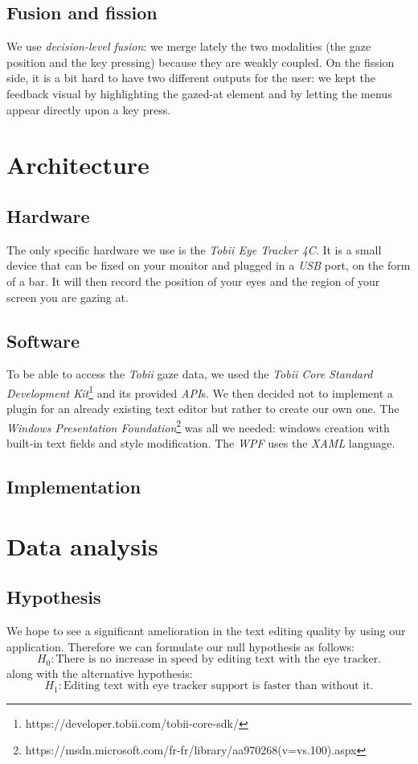 \documentclass[12pt, a4paper, twoside]{article}
\begin{document}
\subsection{Fusion and fission}
We use \textit{decision-level fusion}: we merge lately the two modalities (the gaze position and the key pressing) because they are weakly coupled. On the fission side, it is a bit hard to have two different outputs for the user: we kept the feedback visual by highlighting the gazed-at element and by letting the menus appear directly upon a key press.  

\section{Architecture}

\subsection{Hardware}
The only specific hardware we use is the \textit{Tobii Eye Tracker 4C}. It is a small device that can be fixed on your monitor and plugged in a \textit{USB} port, on the form of a bar. It will then record the position of your eyes and the region of your screen you are gazing at. 

\subsection{Software}
To be able to access the \textit{Tobii} gaze data, we used the \textit{Tobii Core Standard Development Kit}\footnote{https://developer.tobii.com/tobii-core-sdk/} and its provided \textit{API}s. We then decided not to implement a plugin for an already existing text editor but rather to create our own one. The \textit{Windows Presentation Foundation}\footnote{https://msdn.microsoft.com/fr-fr/library/aa970268(v=vs.100).aspx} was all we needed: windows creation with built-in text fields and style modification. The \textit{WPF} uses the \textit{XAML} language. 

\subsection{Implementation}


\section{Data analysis}

\subsection{Hypothesis}
We hope to see a significant amelioration in the text editing quality by using our application. Therefore we can formulate our null hypothesis as follows: 
\[H_0: \text{There is no increase in speed by editing text with the eye tracker.}\] 
along with the alternative hypothesis: 
\[H_1: \text{Editing text with eye tracker support is faster than without it.}\]
\end{document}
